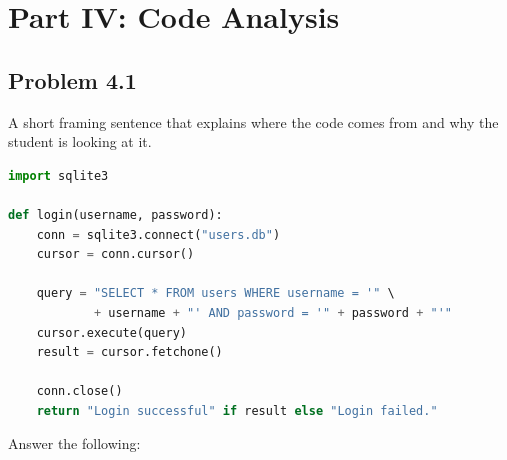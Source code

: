 %
%
%

\section*{Part IV: Code Analysis}


\subsection*{Problem 4.1}

A short framing sentence that explains where the code comes from
and why the student is looking at it.

\begin{lstlisting}[language=Python]
import sqlite3

def login(username, password):
    conn = sqlite3.connect("users.db")
    cursor = conn.cursor()

    query = "SELECT * FROM users WHERE username = '" \
            + username + "' AND password = '" + password + "'"
    cursor.execute(query)
    result = cursor.fetchone()

    conn.close()
    return "Login successful" if result else "Login failed."
\end{lstlisting}

\vspace{2mm}

Answer the following:


